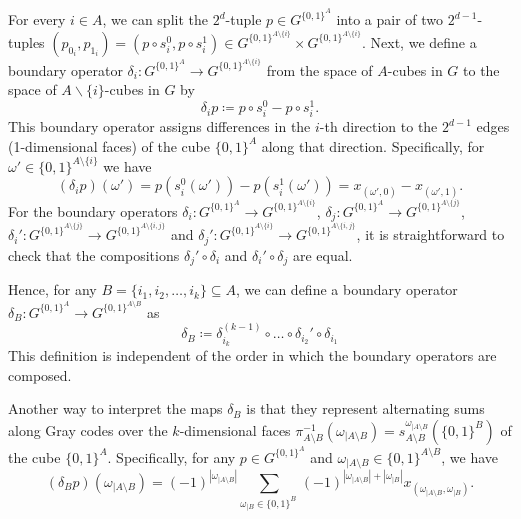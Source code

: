 \documentclass{amsart}
\theoremstyle{definition}
\theoremstyle{remark}
\numberwithin{equation}{section}
\begin{document}
For every $i \in A$, we can split the $2^d$-tuple $p \in G^{\{0,1\}^A}$ into a pair of two $2^{d-1}$-tuples $(p_{0_i},p_{1_i})= (p \circ s^0_i,p\circ s^1_i) \in G^{\{0,1\}^{A \setminus \{i\} }} \times G^{\{0,1\}^{A \setminus \{i\} }}$. Next, we 
define a boundary operator $\delta_i : G^{\{0,1\}^A} \to G^{\{0,1\}^{A \setminus \{i\} }}$ from the space of $A$-cubes in $G$ to the space of $A \backslash \{i\}$-cubes in $G$ by
\begin{equation}
    \delta_i p  \coloneqq p \circ s_i^0 - p \circ s_i^1.
\end{equation}
This boundary operator assigns differences in the $i$-th direction to the $2^{d-1}$ edges (1-dimensional faces) of the cube $\{0,1\}^{A}$ along that direction. Specifically, for $\omega' \in \{0,1\}^{A \setminus \{i\}}$ we have
\begin{equation*}
    (\delta_i p )(\omega') = p(s_i^0(\omega')) - p (s_i^1 (\omega')) = x_{(\omega',0)} - x_{(\omega',1)}.
\end{equation*}
For the boundary operators $\delta_i : G^{\{0,1\}^A} \to G^{\{0,1\}^{A \setminus \{i\} }}$, $\delta_j : G^{\{0,1\}^A} \to G^{\{0,1\}^{A \setminus \{j\} }}$, $\delta_i' : G^{\{0,1\}^{A\setminus \{j\}}} \to G^{\{0,1\}^{A \setminus \{i,j\} }}$ and $\delta_j' : G^{\{0,1\}^{A\setminus \{i\}}} \to G^{\{0,1\}^{A \setminus \{i,j\} }}$, it is straightforward to check that the compositions $\delta_j' \circ \delta_i$ and $\delta_i'\circ \delta_j$ are equal.  

Hence, for any $B=\{i_1, i_2, \dots , i_k\} \subseteq A$, we can define a boundary operator $\delta_B : G^{\{0,1\}^A} \to G^{\{0,1\}^{A \setminus B}}$ as 
\begin{equation*}
\delta_B \coloneqq \delta_{i_k}^{(k-1)} \circ  \dots  \circ \delta_{i_2}'\circ \delta_{i_1}
\end{equation*}
This definition is independent of the order in which the boundary operators are composed. 

Another way to interpret the maps $\delta_B$ is that they represent alternating sums along Gray codes over the $k$-dimensional faces $\pi_{A \setminus B}^{-1}(\omega_{|A\setminus B})=s_{A \setminus B}^{\omega_{|A\setminus B}} \left(\{0,1\}^{B}\right)$ of the cube $\{0,1\}^A$. Specifically, for any $p \in G^{\{0,1\}^A}$ and $\omega_{|A\setminus B} \in \{0,1\}^{A \setminus B}$, we have
\begin{equation}
\label{gray}
    (\delta_B p)(\omega_{|A\setminus B}) = (-1)^{\left|\omega_{|A\setminus B}\right|} \sum_{\omega_{|B} \in \{0,1\}^{B}\ } (-1)^{\left|\omega_{|A\setminus B}\right|+ \left|\omega_{|B}\right|}x_{(\omega_{|A\setminus B}, \omega_{|B})}.
\end{equation}
\end{document}
